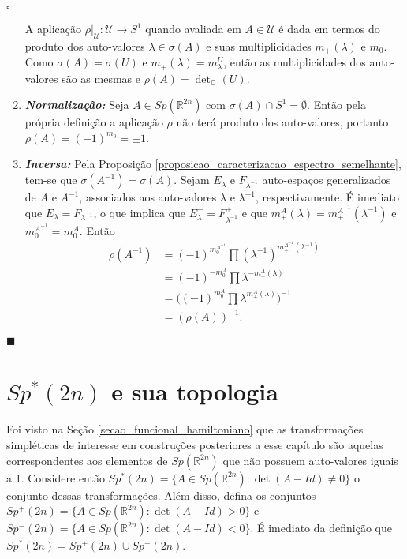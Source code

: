 \documentclass[12pt]{book}
\newenvironment{prova}[1]{$\square$ #1}{\hfill$\blacksquare$}
\newcommand{\autoespaco}[1]{E_{#1}}
\newcommand{\bigparenteses}[1]{\Big( #1 \Big) }
\newcommand{\circulo}{S^{1}}
\newcommand{\complexo}[1]{\mathbb{C}^{#1}}
\newcommand{\espectrooperador}[1]{\sigma(#1)}
\newcommand{\gruposimpletico}[1]{Sp(#1)}
\newcommand{\gruposimpleticonaodegenerado}[1]{Sp^{#1}(2n)}
\newcommand{\real}[1]{\mathbb{R}^{#1}}
\begin{document}
\begin{prova}
\begin{enumerate}
			A aplicação $\rho|_{\mathcal{U}}: \mathcal{U} \to \circulo$ quando avaliada em $A\in \mathcal{U}$ é dada em termos do produto dos auto-valores $\lambda \in \espectrooperador{A}$ e suas multiplicidades $m_{+}(\lambda)$ e $m_{0}$. Como $\espectrooperador{A} = \espectrooperador{U}$ e $m_{+}(\lambda)  = m_{\lambda}^{U}$, então as multiplicidades dos auto-valores são as mesmas e $\rho(A)=\det_{\complexo{}}(U)$.

			\item \textbf{\textit{Normalização:}} Seja $A\in \gruposimpletico{\real{2n}}$ com $\sigma(A)\cap \circulo = \emptyset$. Então pela própria definição a aplicação $\rho$ não terá produto dos auto-valores, portanto $\rho(A) = (-1)^{m_{0}} = \pm 1$. 
			
			\item \textbf{\textit{Inversa:}} Pela Proposição  \ref{proposicao_caracterizacao_espectro_semelhante}, tem-se que $\espectrooperador{A^{-1}} = \espectrooperador{A}$. Sejam $\autoespaco{\lambda}$ e $F_{\lambda^{-1}}$ auto-espaços generalizados de $A$ e $A^{-1}$, associados aos auto-valores $\lambda$ e $\lambda^{-1}$, respectivamente. É imediato que $\autoespaco{\lambda} = F_{\lambda^{-1}}$, o que implica que $\autoespaco{\lambda}^{+} = F_{\lambda^{-1}}^{+}$ e que $m^{A}_{+}(\lambda) = m^{A^{-1}}_{+}(\lambda^{-1})$ e $m_0^{A^{-1}}=m_0^A$. Então
			$$
			\begin{aligned}
			\rho(A^{-1})
			&= (-1)^{m_0^{A^{-1}}}\prod (\lambda^{-1})^{m_{+}^{A^{-1}}(\lambda^{-1})}
			\\
			&=(-1)^{-m_0^{A}}\prod \lambda^{-m_{+}^{A}(\lambda)}
			\\
			&=\bigparenteses{(-1)^{m_{0}^{A}}\prod \lambda^{m_{+}^{A}(\lambda)}}^{-1}
			\\
			&=(\rho(A)) ^{-1}.
			\end{aligned}
			$$
		\end{enumerate}
	\end{prova}
	
	\section{$\gruposimpleticonaodegenerado{*}$ e sua topologia}
	
	Foi visto na Seção \ref{secao_funcional_hamiltoniano} que as transformações simpléticas de interesse em construções posteriores a esse capítulo são aquelas correspondentes aos elementos de $\gruposimpletico{\real{2n}}$ que não possuem auto-valores iguais a 1. Considere então $\gruposimpleticonaodegenerado{*}= \{ A \in \gruposimpletico{\real{2n}}: \det(A-Id)\neq 0 \}$ o conjunto dessas transformações. Além disso, defina os conjuntos $\gruposimpleticonaodegenerado{+}= \{ A \in \gruposimpletico{\real{2n}}: \det(A-Id)> 0 \}$ e $\gruposimpleticonaodegenerado{-}= \{ A \in \gruposimpletico{\real{2n}}: \det(A-Id)<0 \}$. É imediato da definição que $\gruposimpleticonaodegenerado{*}= \gruposimpleticonaodegenerado{+} \cup \gruposimpleticonaodegenerado{-} $.
	
\end{document}
